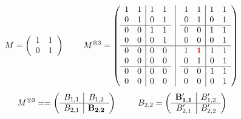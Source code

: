 \documentclass[10pt,a4paper]{amsart}
\begin{document}
\begin{figure}[htb!]
\centering
$$
M =
\left(
\begin{array}{cc}
1 & 1 \\
0 & 1 \\
\end{array}
\right)
\;\;\;\;\;\;\;\;
M^{\otimes 3} =
\left(
\begin{array}{@{}c|c@{}}
\begin{array}{cc|cc}
    1 & 1 & 1 & 1 \\
    0 & 1 & 0 & 1  \\\hline
    0 & 0 & 1 & 1  \\
    0 & 0 & 0 & 1  \\
\end{array}
&
\begin{array}{cc|cc}
     1 & 1 &  1 & 1\\
     0 & 1 &  0 & 1 \\\hline
      0 & 0 &  1 & 1 \\
     0 & 0 &  0 & 1 \\
\end{array}\\\hline
\begin{array}{cc|cc}
    0 & 0 & 0 & 0  \\
    0 & 0 & 0 & 0  \\\hline
    0 & 0 & 0 & 0  \\
    0 & 0 & 0 & 0  \\
\end{array}
&
\begin{array}{cc|cc}
  1 & \textcolor{red}{\bf 1} &  1 & 1 \\
  0 & 1 &  0 & 1 \\\hline
  0 & 0 &  1 & 1 \\
 0 & 0 &  0 & 1 \\
    \end{array}
\end{array}
\right)
$$
\vspace{2em}
\begingroup
   \renewcommand{\arraystretch}{1.6}
$$
M^{\otimes 3} = = \left(\begin{array}{c|c}
  B_{1,1}  &   B_{1,2}\\
\hline
 B_{2,1}  &  {\bf B_{2,2}}
\end{array}\right)
\;\;\;\;\;\;\;\;\;
B_{2,2} = \left(
\begin{array}{c|c}
  {\bf  B'_{1,1}} & B'_{1,2} \\\hline
  B'_{2,1} & B'_{2,2}
  \end{array}\right)
$$
\end{figure}
\end{document}
